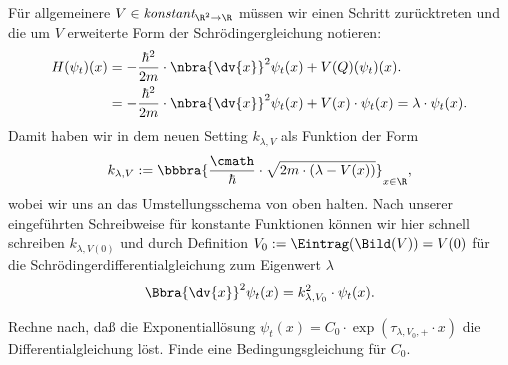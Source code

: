 \documentclass{subfiles}
\begin{document}
        Für allgemeinere $V\in\textit{konstant}_{\R^2\to\R}$ müssen wir einen Schritt zurücktreten und die um $V$ erweiterte Form der Schrödingergleichung notieren: 
        \begin{align*}
            H(\psi_t)(x) &= -\frac{\hbar^2}{2m}\cdot\nbra{\dv{x}}^2\psi_t(x) + V(Q)(\psi_t)(x). \\
            &= -\frac{\hbar^2}{2m}\cdot\nbra{\dv{x}}^2\psi_t(x) + V(x)\cdot\psi_t(x) = \lambda\cdot\psi_t(x).
        \end{align*}
        Damit haben wir in dem neuen Setting $k_{\lambda,V}$ als Funktion der Form 
        \[
            k_{\lambda,V}:=\bbbra{\frac{\cmath}{\hbar}\cdot\sqrt{2m\cdot(\lambda - V(x))}}_{x\in\R},
        \]
        wobei wir uns an das Umstellungsschema von oben halten. Nach unserer eingeführten Schreibweise für konstante Funktionen können wir hier schnell schreiben $k_{\lambda,V(0)}$ und durch Definition $V_0:=\Eintrag(\Bild(V)) = V(0)$ für die Schrödingerdifferentialgleichung zum Eigenwert $\lambda$
        \[
            \Bbra{\dv{x}}^2\psi_t(x) = k_{\lambda,V_0}^2\cdot\psi_t(x).
        \]
        \begin{Aufgabe}
            \nr{} Rechne nach, daß die Exponentiallösung $\psi_t(x) = C_0\cdot{\exp}(\tau_{\lambda,V_0,+}\cdot x)$ die Differentialgleichung löst. Finde eine Bedingungsgleichung für $C_0$. 
        \end{Aufgabe}
        
\end{document}
